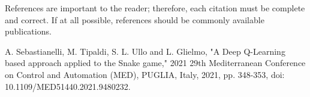\documentclass[conference]{IEEEtran}
\begin{document}

References are important to the reader; therefore, each citation must be complete and correct. If at all possible, references should be commonly available publications.



\begin{thebibliography}{99}
 A. Sebastianelli, M. Tipaldi, S. L. Ullo and L. Glielmo, "A Deep Q-Learning based approach applied to the Snake game," 2021 29th Mediterranean Conference on Control and Automation (MED), PUGLIA, Italy, 2021, pp. 348-353, doi: 10.1109/MED51440.2021.9480232.

\end{thebibliography}
\end{document}
